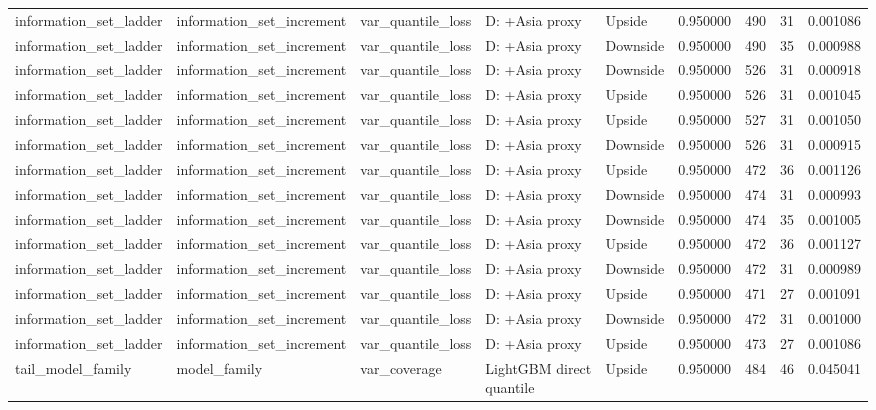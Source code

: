 \begin{tabular}{lllllrrr}
information\_set\_ladder & information\_set\_increment & var\_quantile\_loss & D: +Asia proxy & Upside & 0.950000 & 490 & 31 & 0.001086 \\
information\_set\_ladder & information\_set\_increment & var\_quantile\_loss & D: +Asia proxy & Downside & 0.950000 & 490 & 35 & 0.000988 \\
information\_set\_ladder & information\_set\_increment & var\_quantile\_loss & D: +Asia proxy & Downside & 0.950000 & 526 & 31 & 0.000918 \\
information\_set\_ladder & information\_set\_increment & var\_quantile\_loss & D: +Asia proxy & Upside & 0.950000 & 526 & 31 & 0.001045 \\
information\_set\_ladder & information\_set\_increment & var\_quantile\_loss & D: +Asia proxy & Upside & 0.950000 & 527 & 31 & 0.001050 \\
information\_set\_ladder & information\_set\_increment & var\_quantile\_loss & D: +Asia proxy & Downside & 0.950000 & 526 & 31 & 0.000915 \\
information\_set\_ladder & information\_set\_increment & var\_quantile\_loss & D: +Asia proxy & Upside & 0.950000 & 472 & 36 & 0.001126 \\
information\_set\_ladder & information\_set\_increment & var\_quantile\_loss & D: +Asia proxy & Downside & 0.950000 & 474 & 31 & 0.000993 \\
information\_set\_ladder & information\_set\_increment & var\_quantile\_loss & D: +Asia proxy & Downside & 0.950000 & 474 & 35 & 0.001005 \\
information\_set\_ladder & information\_set\_increment & var\_quantile\_loss & D: +Asia proxy & Upside & 0.950000 & 472 & 36 & 0.001127 \\
information\_set\_ladder & information\_set\_increment & var\_quantile\_loss & D: +Asia proxy & Downside & 0.950000 & 472 & 31 & 0.000989 \\
information\_set\_ladder & information\_set\_increment & var\_quantile\_loss & D: +Asia proxy & Upside & 0.950000 & 471 & 27 & 0.001091 \\
information\_set\_ladder & information\_set\_increment & var\_quantile\_loss & D: +Asia proxy & Downside & 0.950000 & 472 & 31 & 0.001000 \\
information\_set\_ladder & information\_set\_increment & var\_quantile\_loss & D: +Asia proxy & Upside & 0.950000 & 473 & 27 & 0.001086 \\
tail\_model\_family & model\_family & var\_coverage & LightGBM direct quantile & Upside & 0.950000 & 484 & 46 & 0.045041 \\

\end{tabular}
